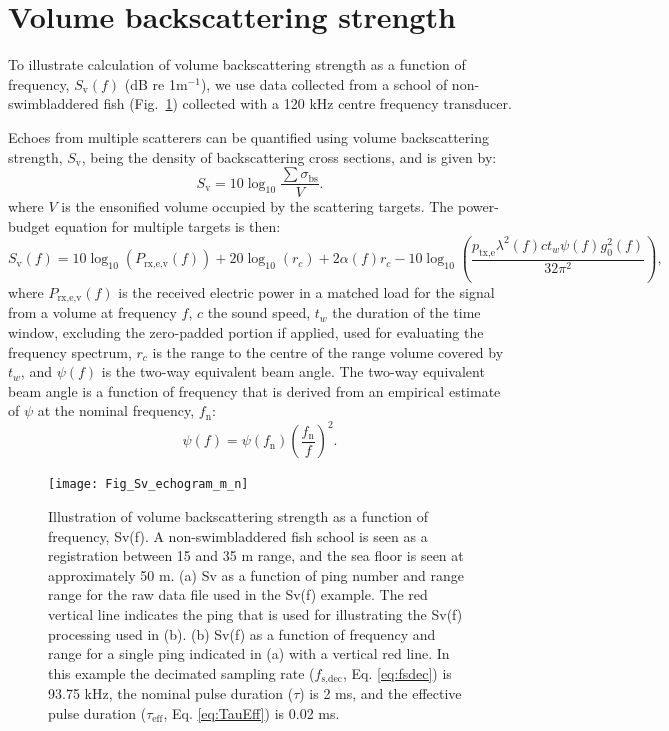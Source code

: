 \documentclass[preprint,12pt,TurnOnLineNumbers]{JASAnew}
\newcommand{\freqsym}{f}
\newcommand{\fsdec}{f_{\textrm{s,dec}}}
\newcommand{\fn}{f_{\textrm{n}}}
\newcommand{\ptxe}{p_{\textrm{tx,e}}}
\newcommand{\tnom}{\tau}
\newcommand{\teff}{\tau_{\textrm{eff}}}
\newcommand{\prxevf}{P_{\textrm{rx,e,v}}}
\newcommand{\tslide}{t_w}
\newcommand{\bs}{\sigma_{\textrm{bs}}}
\newcommand{\sv}{S_{\textrm{v}}}
\newcommand{\range}{r}
\newcommand{\gainzero}{g_0}
\newcommand{\eqang}{\psi}
\newcommand{\wlen}{\lambda}
\newcommand{\cw}{c}
\newcommand{\absorp}{\alpha}
\begin{document}
\section{Volume backscattering strength}

To illustrate calculation of volume backscattering strength as a function of frequency,  $\sv(f)$ (dB re 1m$^{-1}$), we use data collected from a school of non-swimbladdered fish (Fig.~\ref{fi:Fig_Sv_echogram}) collected with a 120 kHz centre frequency transducer. 

Echoes from multiple scatterers can be quantified using volume backscattering strength, $\sv$, being the density of backscattering cross sections, and is given by:
%
\begin{equation}
\label{eq:sv}
\sv  =  10\log_{10}\frac{\sum\bs}{V}.
\end{equation}
%
where $V$ is the ensonified volume occupied by the scattering targets. The power-budget equation for multiple targets is then:
%
\begin{equation}
\label{eq:sv_f}
\sv(\freqsym) = 10\log_{10}(\prxevf(\freqsym)) + 20\log_{10}(\range_c) + 2\absorp(\freqsym)\range_c 
- 10\log_{10}\left( \frac{\ptxe \wlen^2(\freqsym) \cw \tslide \eqang(\freqsym) \gainzero^2(\freqsym)}{32\pi^2} \right), 
\end{equation}
%
where $\prxevf(\freqsym)$ is the received electric power in a matched load for the signal from a volume at frequency $\freqsym$, $\cw$ the sound speed, $\tslide$ the duration of the time window, excluding the zero-padded portion if applied, used for evaluating the frequency spectrum, $\range_c$ is the range to the centre of the range volume covered by $\tslide$, and $\eqang(\freqsym)$ is the two-way equivalent beam angle. The two-way equivalent beam angle is a function of frequency that is derived from an empirical estimate of $\eqang$ at the nominal frequency, $\fn$:
\begin{equation}
\label{eq:PsiFc}
\eqang(f) = \eqang(\fn)\left(\frac{\fn}{f}\right)^2.
\end{equation}

\begin{figure}
\texttt{[image: Fig\_Sv\_echogram\_m\_n]}
\caption{\label{fi:Fig_Sv_echogram} Illustration of volume backscattering strength as a function of frequency, Sv(f). A non-swimbladdered fish school is seen as a registration between 15 and 35 m range, and the sea floor is seen at approximately 50 m. (a) Sv as a function of ping number and range range for the raw data file used in the Sv(f) example. The red vertical line indicates the ping that is used for illustrating the Sv(f) processing used in (b). (b) Sv(f) as a function of frequency and range for a single ping indicated in (a) with a vertical red line. In this example the decimated sampling rate ($\fsdec$, Eq. \ref{eq:fsdec}) is 93.75 kHz, the nominal pulse duration ($\tnom$) is 2 ms, and the effective pulse duration ($\teff$, Eq. \ref{eq:TauEff}) is 0.02 ms.}
\end{figure}
\end{document}
